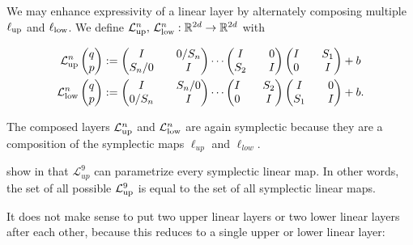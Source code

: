 \documentclass[twoside,a4paper]{article}
\begin{document}
We may enhance expressivity of a linear layer by alternately composing multiple
$\ell_{\text{up}}$ and $\ell_{\text{low}}$. We define 
$\mathcal{L}^{n}_{\text{up}},\, \mathcal{L}^{n}_{\text{low}} : \mathbb{R}^{2d} \to \mathbb{R}^{2d}$ with

\begin{align*}
	\mathcal{L}^{n}_{\text{up}} \begin{pmatrix} q \\ p \end{pmatrix} &:= \begin{pmatrix}
		I && 0 / S_n \\
		S_n / 0 && I
	\end{pmatrix}
	\cdots
	\begin{pmatrix}
		I && 0 \\
		S_2 && I
	\end{pmatrix}
	\begin{pmatrix}
		I && S_1 \\
		0 && I
	\end{pmatrix} + b \\
	\mathcal{L}^{n}_{\text{low}} \begin{pmatrix} q \\ p \end{pmatrix} &:= \begin{pmatrix}
		I && S_n / 0 \\
		0 / S_n && I
	\end{pmatrix}
	\cdots
	\begin{pmatrix}
		I && S_2 \\
		0 && I
	\end{pmatrix}
	\begin{pmatrix}
		I && 0 \\
		S_1 && I
	\end{pmatrix} + b
	.
\end{align*}

The composed layers
$\mathcal{L}^{n}_{\text{up}}$ and $\mathcal{L}^{n}_{\text{low}}$ are again symplectic because they 
are a composition of the symplectic maps $\ell_{up}$ and $\ell_{low}$.

\citeauthor{jin2020unit} show in \cite{jin2020unit} that $\mathcal{L}^{9}_{up}$
can parametrize every symplectic linear map. In other words, 
the set of all possible $\mathcal{L}^{9}_{\text{up}}$ is equal to the set of all symplectic linear maps.

It does not make sense to put two upper linear layers or two lower linear layers after each other,
because this reduces to a single upper or lower linear layer:
\end{document}
